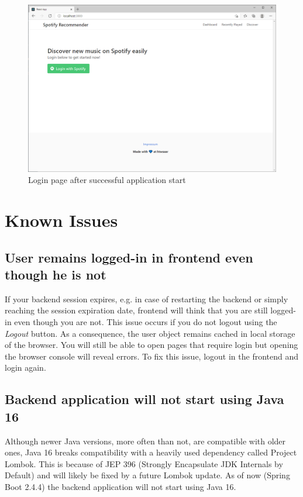 \begin{figure}[bth]
    \centering
    \includegraphics[width=1.0\textwidth]{Graphics/Chapter5/login-page.png}
    \caption{Login page after successful application start}
\end{figure}

\section{Known Issues}

\subsection{User remains logged-in in frontend even though he is not}

If your backend session expires, e.g. in case of restarting the backend or simply reaching the session expiration date, frontend will think that you are still logged-in even though you are not. This issue occurs if you do not logout using the \textit{Logout} button. As a consequence, the user object remains cached in local storage of the browser. You will still be able to open pages that require login but opening the browser console will reveal errors. To fix this issue, logout in the frontend and login again.

\subsection{Backend application will not start using Java 16}

Although newer Java versions, more often than not, are compatible with older ones, Java 16 breaks compatibility with a heavily used dependency called Project Lombok. This is because of JEP 396 (Strongly Encapsulate JDK Internals by Default) and will likely be fixed by a future Lombok update. As of now (Spring Boot 2.4.4) the backend application will not start using Java 16.
